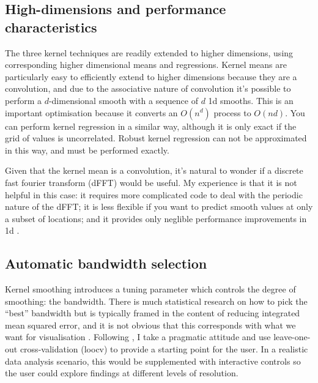 \documentclass[journal]{vgtc}                %
\begin{document}
\subsection{High-dimensions and performance characteristics}

The three kernel techniques are readily extended to higher dimensions, using corresponding higher dimensional means and regressions. Kernel means are particularly easy to efficiently extend to higher dimensions  because they are a convolution, and due to the associative nature of convolution it's possible to perform a $d$-dimensional smooth with a sequence of $d$ 1d smooths. This is an important optimisation because it converts an $O(n^d)$ process to $O(nd)$. You can perform kernel regression in a similar way, although it is only exact if the grid of values is uncorrelated. Robust kernel regression can not be approximated in this way, and must be performed exactly.

Given that the kernel mean is a convolution, it's natural to wonder if a discrete fast fourier transform (dFFT) would be useful. My experience is that it is not helpful in this case: it requires more complicated code to deal with the periodic nature of the dFFT; it is less flexible if you want to predict smooth values at only a subset of locations; and it provides only neglible performance improvements in 1d \citep{wand:1994}.

% 

\subsection{Automatic bandwidth selection}

Kernel smoothing introduces a tuning parameter which controls the degree of smoothing: the bandwidth. There is much statistical research on how to pick the ``best'' bandwidth but is typically framed in the content of reducing integrated mean squared error, and it is not obvious that this corresponds with what we want for visualisation \citep{denby:2009}. Following \citep{loader:1999}, I take a pragmatic attitude and use leave-one-out cross-validation ({\sc loocv}) \citep{efron:1983} to provide a starting point for the user. In a realistic data analysis scenario, this would be supplemented with interactive controls so the user could explore findings at different levels of resolution.
\end{document}
